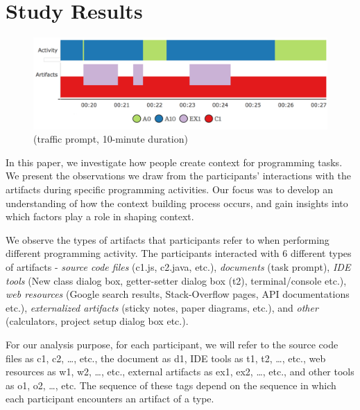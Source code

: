 
\section{Study Results}



\begin{figure}
\includegraphics[width=\columnwidth]{figures/P1timeplot}
\caption{(traffic prompt, 10-minute duration)}
\label{P1Fig}
\end{figure}

In this paper, we investigate how people create context for programming tasks. We present the observations we draw from the participants' interactions with the artifacts during specific programming activities. Our focus was to develop an understanding of how the context building process occurs, and gain insights into which factors play a role in shaping context.


We observe the types of artifacts that participants refer to when performing different programming activity. The participants interacted with 6 different types of artifacts - \textit{source code files} (c1.js, c2.java, etc.), \textit{documents} (task prompt), \textit{IDE tools} (New class dialog box, getter-setter dialog box (t2), terminal/console etc.),\textit{ web resources} (Google search results, Stack-Overflow pages, API documentations etc.), \textit{externalized artifacts} (sticky notes, paper diagrams, etc.), and \textit{other} (calculators, project setup dialog box etc.).

For our analysis purpose, for each participant, we will refer to the source code files as c1, c2, \ldots , etc., the document as d1, IDE tools as t1, t2, \ldots, etc., web resources as w1, w2, \ldots, etc., external artifacts as ex1, ex2, \ldots, etc., and other tools as o1, o2, \ldots, etc. The sequence of these tags depend on the sequence in which each participant encounters an artifact of a type. 

